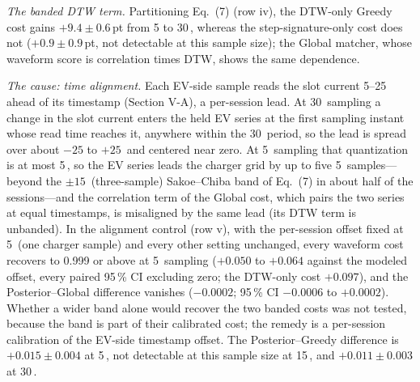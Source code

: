 \documentclass[10pt]{article}
\newcommand{\sq}{\,\text{s}}
\begin{document}
\emph{The banded DTW term.} Partitioning Eq.~(7) (row iv), the DTW-only Greedy cost gains $+9.4 \pm 0.6$\,pt from 5 to 30\sq, whereas the step-signature-only cost does not ($+0.9 \pm 0.9$\,pt, not detectable at this sample size); the Global matcher, whose waveform score is correlation times DTW, shows the same dependence.

\emph{The cause: time alignment.} Each EV-side sample reads the slot current 5--25\sq{} ahead of its timestamp (Section V-A), a per-session lead. At 30\sq{} sampling a change in the slot current enters the held EV series at the first sampling instant whose read time reaches it, anywhere within the 30\sq{} period, so the lead is spread over about $-25$ to $+25$\sq{} and centered near zero. At 5\sq{} sampling that quantization is at most 5\sq, so the EV series leads the charger grid by up to five 5\sq{} samples---beyond the $\pm 15$\sq{} (three-sample) Sakoe--Chiba band of Eq.~(7) in about half of the sessions---and the correlation term of the Global cost, which pairs the two series at equal timestamps, is misaligned by the same lead (its DTW term is unbanded). In the alignment control (row v), with the per-session offset fixed at 5\sq{} (one charger sample) and every other setting unchanged, every waveform cost recovers to 0.999 or above at 5\sq{} sampling ($+0.050$ to $+0.064$ against the modeled offset, every paired 95\,\% CI excluding zero; the DTW-only cost $+0.097$), and the Posterior--Global difference vanishes ($-0.0002$; 95\,\% CI $-0.0006$ to $+0.0002$). Whether a wider band alone would recover the two banded costs was not tested, because the band is part of their calibrated cost; the remedy is a per-session calibration of the EV-side timestamp offset. The Posterior--Greedy difference is $+0.015 \pm 0.004$ at 5\sq, not detectable at this sample size at 15\sq, and $+0.011 \pm 0.003$ at 30\sq.
\end{document}
